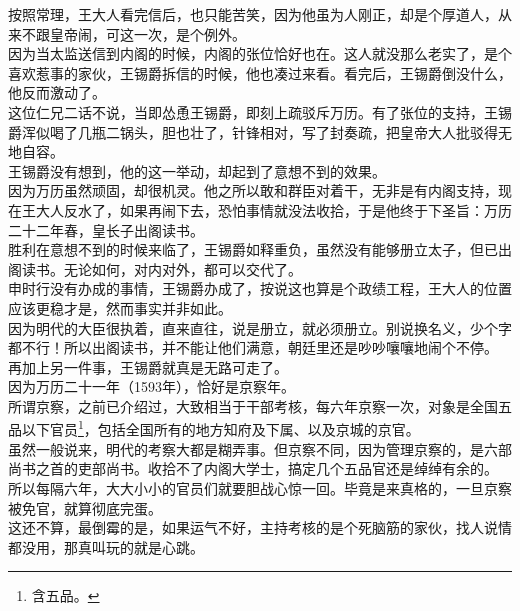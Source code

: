 \begin{multicols}{\theparacolNo}
按照常理，王大人看完信后，也只能苦笑，因为他虽为人刚正，却是个厚道人，从来不跟皇帝闹，可这一次，是个例外。\\

因为当太监送信到内阁的时候，内阁的张位恰好也在。这人就没那么老实了，是个喜欢惹事的家伙，王锡爵拆信的时候，他也凑过来看。看完后，王锡爵倒没什么，他反而激动了。\\

这位仁兄二话不说，当即怂恿王锡爵，即刻上疏驳斥万历。有了张位的支持，王锡爵浑似喝了几瓶二锅头，胆也壮了，针锋相对，写了封奏疏，把皇帝大人批驳得无地自容。\\

王锡爵没有想到，他的这一举动，却起到了意想不到的效果。\\

因为万历虽然顽固，却很机灵。他之所以敢和群臣对着干，无非是有内阁支持，现在王大人反水了，如果再闹下去，恐怕事情就没法收拾，于是他终于下圣旨：万历二十二年春，皇长子出阁读书。\\

胜利在意想不到的时候来临了，王锡爵如释重负，虽然没有能够册立太子，但已出阁读书。无论如何，对内对外，都可以交代了。\\

申时行没有办成的事情，王锡爵办成了，按说这也算是个政绩工程，王大人的位置应该更稳才是，然而事实并非如此。\\

因为明代的大臣很执着，直来直往，说是册立，就必须册立。别说换名义，少个字都不行！所以出阁读书，并不能让他们满意，朝廷里还是吵吵嚷嚷地闹个不停。\\

再加上另一件事，王锡爵就真是无路可走了。\\

因为万历二十一年（1593年），恰好是京察年。\\

所谓京察，之前已介绍过，大致相当于干部考核，每六年京察一次，对象是全国五品以下官员\footnote{含五品。}，包括全国所有的地方知府及下属、以及京城的京官。\\

虽然一般说来，明代的考察大都是糊弄事。但京察不同，因为管理京察的，是六部尚书之首的吏部尚书。收拾不了内阁大学士，搞定几个五品官还是绰绰有余的。\\

所以每隔六年，大大小小的官员们就要胆战心惊一回。毕竟是来真格的，一旦京察被免官，就算彻底完蛋。\\

这还不算，最倒霉的是，如果运气不好，主持考核的是个死脑筋的家伙，找人说情都没用，那真叫玩的就是心跳。\\


\end{multicols}
